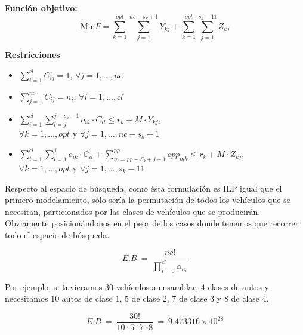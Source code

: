 \textbf{Función objetivo:}
$$\text{Min} F = \sum\limits_{k=1}^{opt} \sum\limits_{j=1}^{nc-s_{k}+1} Y_{kj} + \sum\limits_{k=1}^{opt} \sum\limits_{j=1}^{s_{k}-11} Z_{kj}$$

\textbf{Restricciones}
\begin{itemize}
	\item $\sum\limits_{i=1}^{cl} C_{ij} = 1$, $\forall j = 1,\ldots,nc$
	\item $\sum\limits_{j=1}^{nc} C_{ij} = n_{i}$, $\forall i = 1,\ldots,cl$
	\item $\sum\limits_{i=1}^{cl} \sum\limits_{l=j}^{j+s_{k}-1} o_{ik} \cdot
		C_{il} \leq r_{k} + M\cdot Y_{kj}$,\\ $\forall k = 1,\ldots,opt$ y $\forall j=1,\ldots, nc-s_{k}+1$
	\item $\sum\limits_{i=1}^{cl} \sum\limits_{l=1}^{j} o_{ik} \cdot
		C_{il} + \sum\limits_{m=pp-S_{k}+j+1}^{pp} cpp_{mk} \leq r_{k} + M\cdot Z_{kj}$,\\ $\forall k = 1,\ldots,opt$ y $\forall j=1,\ldots, s_{k}-11$
\end{itemize}

Respecto al espacio de búsqueda, como ésta formulación es ILP igual que el primero modelamiento, sólo sería la permutación de todos
los vehículos que se necesitan,  particionados por las clases de vehículos que se producirán. Obviamente posicionándonos en el peor de los casos
donde tenemos que recorrer todo el espacio de búsqueda.

$$E.B\ =\ \frac{nc!}{\prod\limits_{i = 0}^{cl}\alpha_{n_i}}$$

Por ejemplo, si tuvieramos $30$ vehículos a ensamblar, $4$ clases de autos y
necesitamos $10$ autos de clase $1$, $5$ de clase $2$, $7$ de clase $3$ y $8$ de clase 4.

$$E.B\ =\ \frac{30!}{10\cdot 5\cdot 7\cdot 8}\ =\ 9.473316\times 10^{28}$$


